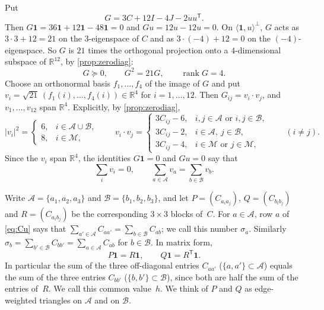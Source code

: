 \documentclass[11pt,a4paper]{amsart}
\theoremstyle{definition}
\theoremstyle{remark}
\newcommand{\R}{\mathbb{R}}
\newcommand{\one}{\mathbf{1}}
\newcommand{\cA}{\mathcal{A}}
\newcommand{\cB}{\mathcal{B}}
\newcommand{\cM}{\mathcal{M}}
\newcommand{\T}{\mathsf{T}}
\newcommand{\rk}{\operatorname{rank}}
\begin{document}
Put
\begin{equation}\label{eq:G}
G=3C+12I-4J-2uu^{\T}.
\end{equation}
Then $G\one=36\one+12\one-48\one=0$ and $Gu=12u-12u=0$. On $\langle\one,u\rangle^\perp$, $G$ acts as
$3\cdot3+12=21$ on the $3$-eigenspace of $C$ and as $3\cdot(-4)+12=0$ on the $(-4)$-eigenspace. So $G$ is
$21$ times the orthogonal projection onto a $4$-dimensional subspace of $\R^{12}$, by
\cref{prop:zerodiag}:
\begin{equation}\label{eq:Gproj}
G\succeq0,\qquad G^2=21G,\qquad \rk G=4 .
\end{equation}
Choose an orthonormal basis $f_1,\dots,f_4$ of the image of $G$ and put $v_i=\sqrt{21}\,(f_1(i),\dots,f_4(i))\in\R^4$
for $i=1,\dots,12$. Then $G_{ij}=v_i\cdot v_j$, and $v_1,\dots,v_{12}$ span $\R^4$. Explicitly, by
\cref{prop:zerodiag},
\begin{equation}\label{eq:ip}
|v_i|^2=\begin{cases}6,&i\in\cA\cup\cB,\\8,&i\in\cM,\end{cases}\qquad
v_i\cdot v_j=\begin{cases}3C_{ij}-6,&i,j\in\cA\text{ or }i,j\in\cB,\\
3C_{ij}-2,&i\in\cA,\ j\in\cB,\\
3C_{ij}-4,&i\in\cM\text{ or }j\in\cM,\end{cases}\qquad(i\ne j).
\end{equation}
Since the $v_i$ span $\R^4$, the identities $G\one=0$ and $Gu=0$ say that
\begin{equation}\label{eq:sums}
\sum_{i}v_i=0,\qquad \sum_{a\in\cA}v_a=\sum_{b\in\cB}v_b .
\end{equation}

Write $\cA=\{a_1,a_2,a_3\}$ and $\cB=\{b_1,b_2,b_3\}$, and let $P=(C_{a_ia_j})$, $Q=(C_{b_ib_j})$ and
$R=(C_{a_ib_j})$ be the corresponding $3\times3$ blocks of~$C$. For $a\in\cA$, row $a$ of \eqref{eq:Cu} says
that $\sum_{a'\in\cA}C_{aa'}=\sum_{b\in\cB}C_{ab}$; we call this number $\sigma_a$. Similarly
$\sigma_b=\sum_{b'\in\cB}C_{bb'}=\sum_{a\in\cA}C_{ab}$ for $b\in\cB$. In matrix form,
\begin{equation}\label{eq:margins}
P\one=R\one,\qquad Q\one=R^{\T}\one .
\end{equation}
In particular the sum of the three off-diagonal entries $C_{aa'}$ ($\{a,a'\}\subset\cA$) equals the sum of the
three entries $C_{bb'}$ ($\{b,b'\}\subset\cB$), since both are half the sum of the entries of~$R$. We call
this common value~$h$. We think of $P$ and $Q$ as edge-weighted triangles on $\cA$ and on $\cB$.
\end{document}
